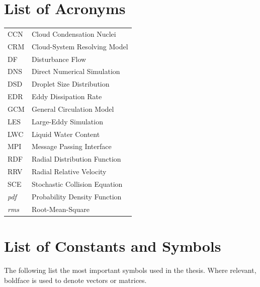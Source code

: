 \documentclass [12pt,letterpaper]{report}
\begin{document}
\tableofcontents
\listoffigures
\listoftables

\newpage

\chapter*{List of Acronyms}
\begin{flushleft}
\begin{longtable}{p{6cm}p{13cm}}
  CCN          &  Cloud Condensation Nuclei\\
  CRM          &  Cloud-System Resolving Model\\
  DF           &  Disturbance Flow\\
  DNS            &  Direct Numerical Simulation\\
  DSD          &  Droplet Size Distribution\\
  EDR          &  Eddy Dissipation Rate\\
  GCM          &  General Circulation Model\\
  LES           &  Large-Eddy Simulation\\
  LWC          &  Liquid Water Content\\
  MPI          &  Message Passing Interface\\
  RDF          &  Radial Distribution Function\\
  RRV          &  Radial Relative Velocity\\
  SCE          &  Stochastic Collision Equation\\
  \emph{pdf}    &  Probability Density Function\\
  \emph{rms}    &  Root-Mean-Square\\
\end{longtable}
\end{flushleft}

\newpage
\chapter*{List of Constants and Symbols}

The following list the most important symbols used in the thesis. Where relevant, boldface is used to denote vectors or matrices.
\end{document}
